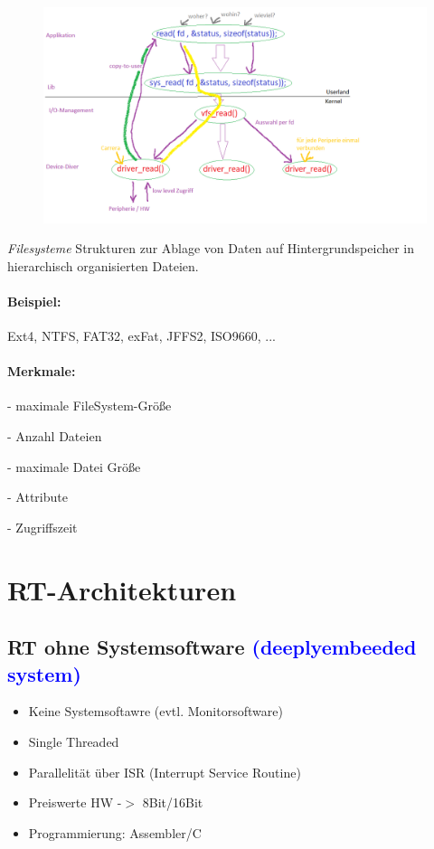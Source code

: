 \documentclass[12pt,a4paper,oneside,ngerman]{article}
\begin{document}
\begin{figure}[ht]
	\centering
	\includegraphics[scale=0.5]{umlet/Seite_34.png}
\end{figure}

\emph{Filesysteme}
Strukturen zur Ablage von Daten auf Hintergrundspeicher in hierarchisch organisierten Dateien.\\
\paragraph{Beispiel:} Ext4, NTFS, FAT32, exFat, JFFS2, ISO9660, ...\\

\paragraph{Merkmale:}
\begin{description}
	\item - maximale FileSystem-Größe
	\item - Anzahl Dateien
	\item - maximale Datei Größe
	\item - Attribute
	\item - Zugriffszeit
\end{description}

\section[RT-Architekturen]{RT-Architekturen}
\subsection{RT ohne Systemsoftware \textcolor{blue}{(deeplyembeeded system)}}
\begin{itemize}
	\item Keine Systemsoftawre (evtl. Monitorsoftware)
	\item Single Threaded
	\item Parallelität über ISR (Interrupt Service Routine)
	\item Preiswerte HW -$>$ 8Bit/16Bit
	\item Programmierung: Assembler/C
\end{itemize}
\end{document}
